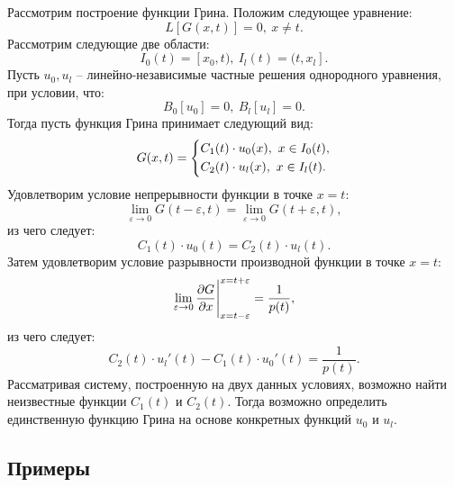 	Рассмотрим построение функции Грина. Положим следующее уравнение:
	\[ L[G(x, t)] = 0, ~ x \neq t. \]
	Рассмотрим следующие две области:
	\[ I_0(t) = [x_0, t), ~ I_l(t) = (t, x_l]. \]
	Пусть $u_0, u_l$ -- линейно-независимые частные решения однородного уравнения, при условии, что:
	\[ B_0[u_0] = 0, ~ B_l[u_l] = 0. \]
	Тогда пусть функция Грина принимает следующий вид:
	\[ G(x, t) = \left\lbrace \begin{aligned} 
		& C_1(t) \cdot u_0(x), ~ x \in I_0(t), \\
		& C_2(t) \cdot u_l(x), ~ x \in I_l(t).
	 \end{aligned} \right. \]
	Удовлетворим условие непрерывности функции в точке $x = t$:
	\[ \lim\limits_{\varepsilon \to 0} G(t - \varepsilon, t) = \lim\limits_{\varepsilon \to 0} G(t + \varepsilon, t), \]
	из чего следует:
	\[ C_1(t) \cdot u_0(t) = C_2(t) \cdot u_l(t). \]
	Затем удовлетворим условие разрывности производной функции в точке $x = t$:
	\[ \lim\limits_{\varepsilon \to 0} \dfrac{\partial G}{\partial x} \Biggl\vert \Biggr._{x = t - \varepsilon}^{x = t + \varepsilon} = \frac{1}{p(t)}, \]
	из чего следует:
	\[ C_2(t) \cdot u_l'(t) - C_1(t) \cdot u_0'(t) = \frac{1}{p(t)}. \]
	Рассматривая систему, построенную на двух данных условиях, возможно найти неизвестные функции $C_1(t)$ и $C_2(t)$. Тогда возможно определить единственную функцию Грина на основе конкретных функций $u_0$ и $u_l$.

	\subsection{Примеры}

